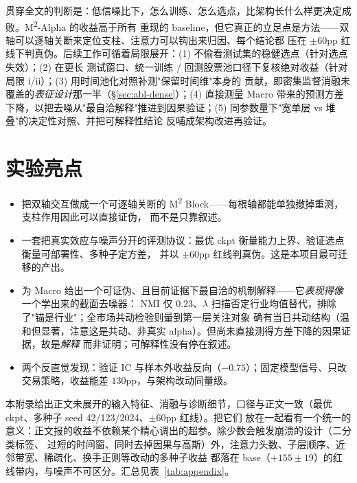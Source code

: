 \documentclass[a4paper,11pt,fontset=fandol]{ctexart}
\newcommand{\msq}{\texorpdfstring{M\textsuperscript{2}}{M2}}  %
\newcommand{\msqa}{\texorpdfstring{M\textsuperscript{2}-Alpha}{M2-Alpha}} %
\begin{document}
贯穿全文的判断是：低信噪比下，怎么训练、怎么选点，比架构长什么样更决定成败。\msqa{} 的收益高于所有
重现的 baseline，但它真正的立足点是方法——双轴可以逐轴关断来定位支柱、注意力可以钩出来归因、每个结论都
压在 $\pm60$pp 红线下判真伪。后续工作可循着局限展开：(1) 不偷看测试集的稳健选点（针对选点失效）；(2) 在更长
测试窗口、统一训练 / 回测股票池口径下复核绝对收益（针对局限 i/ii）；(3) 用时间池化对照补测"保留时间维"本身的
贡献，即密集监督消融未覆盖的\emph{表征设计}那一半（§\ref{sec:abl-dense}）；(4) 直接测量 Macro 带来的预测方差
下降，以把去噪从"最自洽解释"推进到因果验证；(5) 同参数量下"宽单层 vs 堆叠"的决定性对照、并把可解释性结论
反哺成架构改进再验证。

\section*{实验亮点}
\begin{itemize}
  \item 把双轴交互做成一个可逐轴关断的 \msq{} Block——每根轴都能单独撤掉重测，支柱作用因此可以直接证伪，
        而不是只靠叙述。
  \item 一套把真实效应与噪声分开的评测协议：最优 ckpt 衡量能力上界、验证选点衡量可部署性、多种子定方差，
        并以 $\pm60$pp 红线判真伪。这是本项目最可迁移的产出。
  \item 为 Macro 给出一个可证伪、且目前证据下最自洽的机制解释——它\emph{表现得像}一个学出来的截面去噪器：
        NMI 仅 $0.23$、$\lambda$ 扫描否定行业均值替代，排除了"锚是行业"；全市场共动检验则量到第一层关注对象
        确有当日共动结构（温和但显著，注意这是共动、非真实 alpha）。但尚未直接测得方差下降的因果证据，故是\emph{解释}
        而非证明；可解释性没有停在叙述。
  \item 两个反直觉发现：验证 IC 与样本外收益反向（$-0.75$）；固定模型信号、只改交易策略，收益能差
        $130$pp，与架构改动同量级。
\end{itemize}

\appendix

本附录给出正文未展开的输入特征、消融与诊断细节，口径与正文一致（最优 ckpt、多种子 seed 42/123/2024、$\pm60$pp 红线）。把它们
放在一起看有一个统一的意义：正文报的收益不依赖某个精心调出的超参。除少数会触发崩溃的设计（二分类标签、
过短的时间窗、同时去掉因果与高斯）外，注意力头数、子层顺序、近邻带宽、稀疏化、换手正则等改动的多种子收益
都落在 base（$+155\pm19$）的红线带内，与噪声不可区分。汇总见表~\ref{tab:appendix}。
\end{document}
